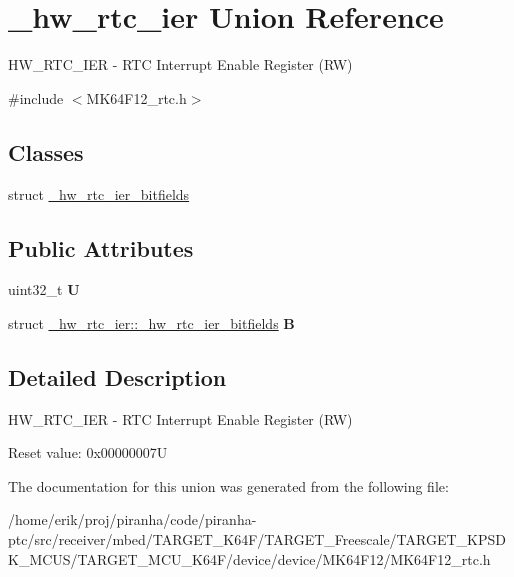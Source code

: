 \hypertarget{union__hw__rtc__ier}{}\section{\+\_\+hw\+\_\+rtc\+\_\+ier Union Reference}
\label{union__hw__rtc__ier}


H\+W\+\_\+\+R\+T\+C\+\_\+\+I\+ER -\/ R\+TC Interrupt Enable Register (RW)  




{\ttfamily \#include $<$M\+K64\+F12\+\_\+rtc.\+h$>$}

\subsection*{Classes}
\begin{DoxyCompactItemize}
\item 
struct \hyperlink{struct__hw__rtc__ier_1_1__hw__rtc__ier__bitfields}{\+\_\+hw\+\_\+rtc\+\_\+ier\+\_\+bitfields}
\end{DoxyCompactItemize}
\subsection*{Public Attributes}
\begin{DoxyCompactItemize}
\item 
uint32\+\_\+t {\bfseries U}\hypertarget{union__hw__rtc__ier_a823a7a45cf88e44f5b960ac918d58794}{}\label{union__hw__rtc__ier_a823a7a45cf88e44f5b960ac918d58794}

\item 
struct \hyperlink{struct__hw__rtc__ier_1_1__hw__rtc__ier__bitfields}{\+\_\+hw\+\_\+rtc\+\_\+ier\+::\+\_\+hw\+\_\+rtc\+\_\+ier\+\_\+bitfields} {\bfseries B}\hypertarget{union__hw__rtc__ier_acf3480d8145d7fe48efa286263f9aedb}{}\label{union__hw__rtc__ier_acf3480d8145d7fe48efa286263f9aedb}

\end{DoxyCompactItemize}


\subsection{Detailed Description}
H\+W\+\_\+\+R\+T\+C\+\_\+\+I\+ER -\/ R\+TC Interrupt Enable Register (RW) 

Reset value\+: 0x00000007U 

The documentation for this union was generated from the following file\+:\begin{DoxyCompactItemize}
\item 
/home/erik/proj/piranha/code/piranha-\/ptc/src/receiver/mbed/\+T\+A\+R\+G\+E\+T\+\_\+\+K64\+F/\+T\+A\+R\+G\+E\+T\+\_\+\+Freescale/\+T\+A\+R\+G\+E\+T\+\_\+\+K\+P\+S\+D\+K\+\_\+\+M\+C\+U\+S/\+T\+A\+R\+G\+E\+T\+\_\+\+M\+C\+U\+\_\+\+K64\+F/device/device/\+M\+K64\+F12/M\+K64\+F12\+\_\+rtc.\+h\end{DoxyCompactItemize}
